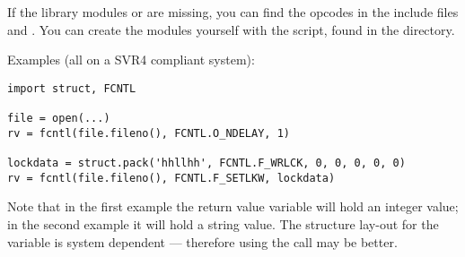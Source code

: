 If the library modules  or
 are missing, you can find the
opcodes in the \C{} include files  and
.  You can create the modules yourself with the
 script, found in the  directory.


Examples (all on a SVR4 compliant system):

\begin{verbatim}
import struct, FCNTL

file = open(...)
rv = fcntl(file.fileno(), FCNTL.O_NDELAY, 1)

lockdata = struct.pack('hhllhh', FCNTL.F_WRLCK, 0, 0, 0, 0, 0)
rv = fcntl(file.fileno(), FCNTL.F_SETLKW, lockdata)
\end{verbatim}

Note that in the first example the return value variable  will
hold an integer value; in the second example it will hold a string
value.  The structure lay-out for the  variable is
system dependent --- therefore using the  call may be
better.
